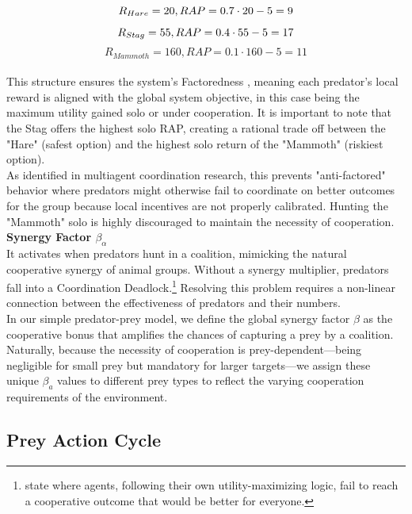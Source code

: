 \documentclass[12pt,a4paper]{report}
\begin{document}
	\[ R_{Hare} = 20,  RAP = 0.7 \cdot 20 - 5 = 9  \\ \]	
	\[ R_{Stag} = 55,  RAP = 0.4 \cdot 55 - 5 = 17  \\ \]	
	\[ R_{Mammoth} = 160,  RAP = 0.1 \cdot 160 - 5 = 11 \] \\
	
	This structure ensures the system's Factoredness \cite{Agogino2008}, meaning each predator's local reward is aligned with the global system objective, in this case being the maximum utility gained solo or under cooperation. It is important to note that the Stag offers the highest solo RAP, creating a rational trade off between the "Hare" (safest option) and the highest solo return of the "Mammoth" (riskiest option). \\
	
	As identified in multiagent coordination research, this prevents "anti-factored" behavior where predators might otherwise fail to coordinate on better outcomes for the group because  local incentives are not properly calibrated. Hunting the "Mammoth" solo is highly discouraged to maintain the necessity of cooperation. \\
	
	\textbf{Synergy Factor $β_{α}$} \\
	
	It activates when predators hunt in a coalition, mimicking the natural cooperative synergy of animal groups. Without a synergy multiplier, predators fall into a Coordination Deadlock.\footnote{ state where agents, following their own utility-maximizing logic, fail to reach a cooperative outcome that would be better for everyone.} Resolving this problem requires a non-linear connection between the effectiveness of predators and their numbers.\cite{TeixeiraAlves2017} \\
	
	In our simple predator-prey model, we define the global synergy factor $β$ as the cooperative bonus that amplifies the chances of capturing a prey by a coalition. Naturally, because the necessity of cooperation is prey-dependent—being negligible for small prey but mandatory for larger targets—we assign these unique $β_{a}$ values to different prey types to reflect the varying cooperation requirements of the environment.
	
	\subsection{Prey Action Cycle}
	
\end{document}
